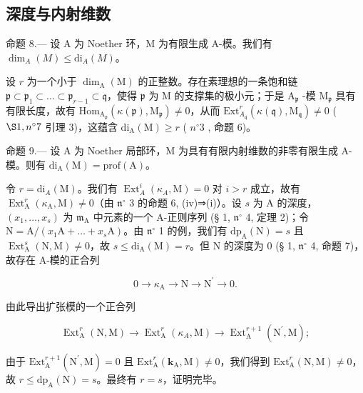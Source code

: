 \subsection{深度与内射维数}

命题 8.--- 设 A 为 Noether 环，M 为有限生成 A-模。我们有 \(\dim_{A}(M) \leqslant \mathrm{di}_{A}(M)\)。

设 \(r\) 为一个小于 \(\dim_{\mathrm{A}}(\mathrm{M})\) 的正整数。存在素理想的一条饱和链 \(\mathfrak{p} \subset \mathfrak{p}_{1} \subset \ldots \subset \mathfrak{p}_{r-1} \subset \mathfrak{q}\)，使得 \(\mathfrak{p}\) 为 M 的支撑集的极小元；于是 \(\mathrm{A}_{\mathfrak{p}}\) -模 \(\mathrm{M}_{\mathfrak{p}}\) 具有有限长度，故有 \(\mathrm{Hom}_{\mathrm{A}_{\mathfrak{p}}}(\kappa(\mathfrak{p}), \mathrm{M}_{\mathfrak{p}}) \neq 0\)，从而 \(\mathrm{Ext}_{A_{\mathfrak{q}}}^{r}(\kappa(\mathfrak{q}), \mathrm{M}_{\mathfrak{q}}) \neq 0\) ( \(\S 1, n^{\circ} 7\) 引理 3)，这蕴含 \(\mathrm{di}_{\mathrm{A}}(\mathrm{M}) \geqslant r\) ( \(n^{\circ} 3\) , 命题 6)。

命题 9.--- 设 A 为 Noether 局部环，M 为具有有限内射维数的非零有限生成 A-模。则有 \(\mathrm{di}_{\mathrm{A}}(\mathrm{M}) = \mathrm{prof}(\mathrm{A})\)。

令 \(r = \mathrm{di}_{A}(\mathrm{M})\)。我们有 \(\operatorname{Ext}_{A}^{i}(\kappa_{A}, \mathrm{M}) = 0\) 对 \(i > r\) 成立，故有 \(\operatorname{Ext}_{\mathrm{A}}^{r}(\kappa_{\mathrm{A}}, \mathrm{M}) \neq 0\)（由 \(\mathfrak{n}^{\circ}\) 3 的命题 6, (iv)⇒(i)）。设 \(s\) 为 A 的深度，\((x_1, \ldots, x_s)\) 为 \(\mathfrak{m}_{\mathrm{A}}\) 中元素的一个 A-正则序列 (§ 1, \(\mathfrak{n}^{\circ}\) 4, 定理 2)；令 \(\mathrm{N} = \mathrm{A}/(x_1\mathrm{A} + \ldots + x_s\mathrm{A})\)。由 \(\mathfrak{n}^{\circ}\) 1 的例，我们有 \(\mathrm{dp}_{\mathrm{A}}(\mathrm{N}) = s\) 且 \(\operatorname{Ext}_{\mathrm{A}}^{s}(\mathrm{N}, \mathrm{M}) \neq 0\)，故 \(s \leqslant \mathrm{di}_{\mathrm{A}}(\mathrm{M}) = r\)。但 N 的深度为 0 (§ 1, \(\mathfrak{n}^{\circ}\) 4, 命题 7)，故存在 A-模的正合列

\[
0 \rightarrow \kappa_ {\mathrm{A}} \longrightarrow \mathrm{N} \longrightarrow \mathrm{N} ^ {\prime} \rightarrow 0.
\]

由此导出扩张模的一个正合列

\[
\operatorname{Ext} _ {\mathrm{A}} ^ {r} (\mathrm{N}, \mathrm{M}) \longrightarrow \operatorname{Ext} _ {\mathrm{A}} ^ {r} (\kappa_ {A}, \mathrm{M}) \longrightarrow \operatorname{Ext} _ {\mathrm{A}} ^ {r + 1} (\mathrm{N} ^ {\prime}, \mathrm{M});
\]

由于 \(\mathrm{Ext}_{\mathrm{A}}^{r + 1}(\mathrm{N}^{\prime},\mathrm{M}) = 0\) 且 \(\mathrm{Ext}_{\mathrm{A}}^{r}(\mathbf{k}_{\mathrm{A}},\mathrm{M})\neq 0\)，我们得到 \(\mathrm{Ext}_{\mathrm{A}}^{r}(\mathrm{N},\mathrm{M})\neq 0\)，故 \(r\leqslant \mathrm{dp}_{\mathrm{A}}(\mathrm{N}) = s\)。最终有 \(r = s\)，证明完毕。
\relax{}
